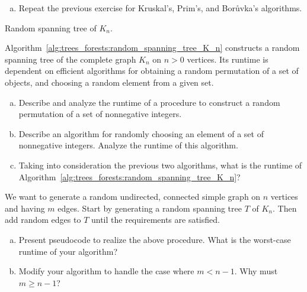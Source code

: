 \begin{problem}
\begin{enumerate}[(a)]
  \item Repeat the previous exercise for
    Kruskal's,
    Prim's, and
    Bor\r{u}vka's algorithms.
  \end{enumerate}

\begin{algorithm}[!htbp]

\caption{Random spanning tree of $K_n$.}
\label{alg:trees_forests:random_spanning_tree_K_n}
\end{algorithm}

\item Algorithm~\ref{alg:trees_forests:random_spanning_tree_K_n}
  constructs a random spanning tree of the complete graph $K_n$ on
  $n > 0$ vertices. Its runtime is dependent on efficient algorithms
  for obtaining a random permutation of a set of objects, and choosing
  a random element from a given set.
  \begin{enumerate}[(a)]
  \item Describe and analyze the runtime of a procedure to construct a
    random permutation of a set of
    nonnegative integers.

  \item Describe an algorithm for randomly choosing an element of a
    set of nonnegative integers. Analyze the runtime of this
    algorithm.

  \item Taking into consideration the previous two algorithms, what is
    the runtime of
    Algorithm~\ref{alg:trees_forests:random_spanning_tree_K_n}?
  \end{enumerate}

\item We want to generate a random undirected,
  connected simple graph on $n$ vertices and
  having $m$ edges. Start by generating a random
  spanning tree $T$ of
  $K_n$. Then add random edges to $T$ until the
  requirements are satisfied.
  \begin{enumerate}[(a)]
  \item Present pseudocode to realize the above procedure. What is the
    worst-case runtime of your algorithm?

  \item Modify your algorithm to handle the case where $m < n-1$. Why
    must $m \geq n-1$?


\end{enumerate}
\end{problem}
